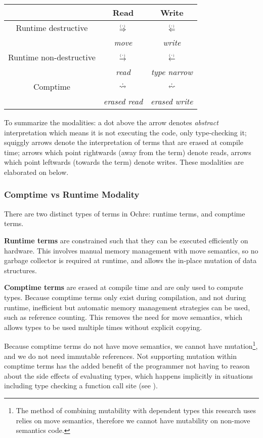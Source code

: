 \documentclass[12pt,twoside]{report}
\begin{document}
\begin{tabular}{c|c|c}
  & Read & Write \\
  \hline
  Runtime destructive & $\,\stackrel{_(._)}{\Rightarrow}\,$ & $\,\stackrel{_(._)}{\Leftarrow}\,$ \\
  & \textit{move} & \textit{write}\\
  Runtime non-destructive & $\,\stackrel{_(._)}{\rightarrow}\,$ & $\,\stackrel{_(._)}{\leftarrow}\,$ \\
  & \textit{read} & \textit{type narrow}\\
  Comptime & $\,\dot{\rightsquigarrow}\,$ &  $\erasedwritearrow$ \\
  & \textit{erased read} & \textit{erased write}\\
\end{tabular}

To summarize the modalities: a dot above the arrow denotes \textit{abstract} interpretation which means it is not executing the code, only type-checking it; squiggly arrows denote the interpretation of terms that are erased at compile time; arrows which point rightwards (away from the term) denote reads, arrows which point leftwards (towards the term) denote writes. These modalities are elaborated on below.

\subsubsection{Comptime vs Runtime Modality}
There are two distinct types of terms in Ochre: runtime terms, and comptime terms.

\textbf{Runtime terms} are constrained such that they can be executed efficiently on hardware. This involves manual memory management with move semantics, so no garbage collector is required at runtime, and allows the in-place mutation of data structures.

\textbf{Comptime terms} are erased at compile time and are only used to compute types. Because comptime terms only exist during compilation, and not during runtime, inefficient but automatic memory management strategies can be used, such as reference counting. This removes the need for move semantics, which allows types to be used multiple times without explicit copying.

Because comptime terms do not have move semantics, we cannot have mutation\footnote{The method of combining mutability with dependent types this research uses relies on move semantics, therefore we cannot have mutability on non-move semantics code.}, and we do not need immutable references. Not supporting mutation within comptime terms has the added benefit of the programmer not having to reason about the side effects of evaluating types, which happens implicitly in situations including type checking a function call site (see ).
 
\end{document}
